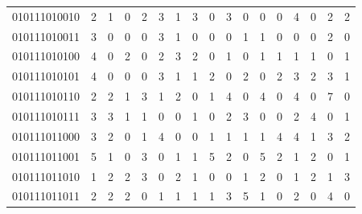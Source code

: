 \documentclass[10pt,a4paper]{article}
\begin{document}
\begin{longtable}{ |c|c|c|c|c|c|c|c|c|c|c|c|c|c|c|c|c| }
    010111010010              & 2                            & 1                                & 0                            & 2                              & 3   & 1   & 3   & 0   & 3   & 0   & 0   & 0   & 4   & 0   & 2   & 2   \\
    010111010011              & 3                            & 0                                & 0                            & 0                              & 3   & 1   & 0   & 0   & 0   & 1   & 1   & 0   & 0   & 0   & 2   & 0   \\
    010111010100              & 4                            & 0                                & 2                            & 0                              & 2   & 3   & 2   & 0   & 1   & 0   & 1   & 1   & 1   & 1   & 0   & 1   \\
    010111010101              & 4                            & 0                                & 0                            & 0                              & 3   & 1   & 1   & 2   & 0   & 2   & 0   & 2   & 3   & 2   & 3   & 1   \\
    010111010110              & 2                            & 2                                & 1                            & 3                              & 1   & 2   & 0   & 1   & 4   & 0   & 4   & 0   & 4   & 0   & 7   & 0   \\
    010111010111              & 3                            & 3                                & 1                            & 1                              & 0   & 0   & 1   & 0   & 2   & 3   & 0   & 0   & 2   & 4   & 0   & 1   \\
    010111011000              & 3                            & 2                                & 0                            & 1                              & 4   & 0   & 0   & 1   & 1   & 1   & 1   & 4   & 4   & 1   & 3   & 2   \\
    010111011001              & 5                            & 1                                & 0                            & 3                              & 0   & 1   & 1   & 5   & 2   & 0   & 5   & 2   & 1   & 2   & 0   & 1   \\
    010111011010              & 1                            & 2                                & 2                            & 3                              & 0   & 2   & 1   & 0   & 0   & 1   & 2   & 0   & 1   & 2   & 1   & 3   \\
    010111011011              & 2                            & 2                                & 2                            & 0                              & 1   & 1   & 1   & 1   & 3   & 5   & 1   & 0   & 2   & 0   & 4   & 0   \\

\end{longtable}
\end{document}
